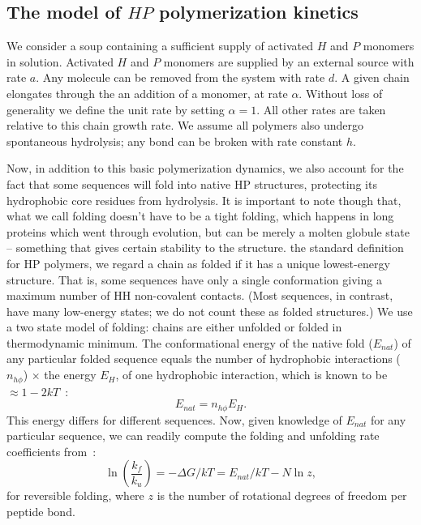 \documentclass[journal=jacsat,manuscript=article,layout=twocolumn]{achemso}
\newcommand*{\ga}{\alpha}
\newcommand*{\gD}{\Delta}
\newcommand*{\pt}[1]{\left( #1\right)}
\begin{document}
\subsection{The model of $HP$ polymerization kinetics}

 We consider a soup containing a sufficient supply of activated $H$ and $P$ monomers in solution. 
 Activated $H$ and $P$ monomers are supplied by an external source with rate $a$.  Any molecule 
can 
be removed from the system with rate $d$.  A given chain elongates through the 
an addition of a monomer, at rate $\ga$. Without loss of 
generality we define the unit rate by setting $\ga = 1$.  All other rates are taken relative to 
this 
chain growth rate.  We assume all polymers also undergo spontaneous hydrolysis; any bond can be 
broken with rate constant $h$.  

 Now, in addition to this basic polymerization dynamics, we also account for the fact that some 
sequences 
will fold into native HP structures, protecting its hydrophobic core residues from hydrolysis.  It 
is important to note though that, what we call folding doesn't have to be a tight folding, which 
happens in long proteins which went through evolution, but can be merely a molten globule state -- 
something that gives certain stability to the structure.
the standard definition for HP polymers, we regard a chain as folded if it has a unique 
lowest-energy structure.  That is, some sequences have only a single conformation giving a maximum 
number of HH non-covalent contacts.  (Most sequences, in contrast, 
have many low-energy states; we do not count these as folded structures.)  
We use a two state model of folding: chains are either unfolded or folded in 
thermodynamic minimum. 
The conformational energy of the native fold ($E_{nat}$) of any particular folded sequence equals 
the number of hydrophobic interactions ($n_{h\phi}$) $\times$ the energy $E_H$, of one hydrophobic 
interaction, which is known to be $\approx 1-2kT$~\cite{Ghosh2009}:
\begin{equation}
 E_{nat}=n_{h\phi}E_H.
\end{equation} 
This energy differs for different sequences.  Now, given knowledge of $E_{nat}$ for any particular 
sequence, we can readily compute the folding and unfolding rate coefficients from~\cite{Ghosh2009}:
\begin{equation}
 \ln\pt{\frac{k_f}{k_u}}=-\gD G/kT = E_{nat}/kT-N\ln z,
\end{equation} 
for reversible folding, where $z$ is the number of rotational degrees of freedom per peptide bond. 
 
\end{document}
